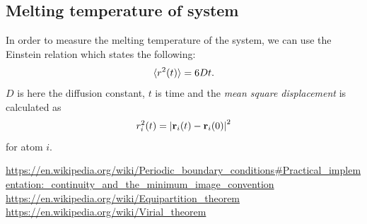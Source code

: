 \documentclass[a4paper]{article}
\renewcommand{\vec}[1]{\mathbf{#1}}
\begin{document}
\subsection{Melting temperature of system}
\label{sub:melting_temperature_of_system}

In order to measure the melting temperature of the system, we can use the Einstein relation which states the following:
\begin{equation}
    \notag
    \langle r^2(t) \rangle = 6Dt.
\end{equation}
$D$ is here the diffusion constant, $t$ is time and the \emph{mean square displacement} is calculated as
\begin{equation}
    \notag
    r_i^2(t) = \left| \vec{r}_i(t) - \vec{r}_i(0) \right|^2
\end{equation}
for atom $i$.

\clearpage

\begin{thebibliography}{9}
    \url{https://en.wikipedia.org/wiki/Periodic_boundary_conditions#Practical_implementation:_continuity_and_the_minimum_image_convention}
    \url{https://en.wikipedia.org/wiki/Equipartition\_theorem}
    \url{https://en.wikipedia.org/wiki/Virial_theorem}
\end{thebibliography}
\end{document}
